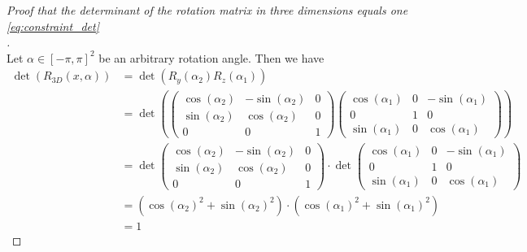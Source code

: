 \begin{proof}[Proof that the determinant of the rotation matrix in three dimensions equals one \eqref{eq:constraint_det}\\]$\,$\\
	Let $\alpha \in [-\pi, \pi]^2$ be an arbitrary rotation angle. Then we have
	\begin{equation}
	\label{proof:det_one_dim3}
	\begin{aligned}
	\det (R_{3D}(x, \alpha)) &= \det(R_{y}(\alpha_2) R_{z}(\alpha_1)) \\
	&= \det \left( \begin{pmatrix} \cos(\alpha_2) & -\sin(\alpha_2) & 0\\\sin(\alpha_2) & \cos(\alpha_2) & 0\\ 0 & 0 & 1\end{pmatrix} \begin{pmatrix} \cos(\alpha_1) & 0 & -\sin(\alpha_1)\\ 0 & 1 & 0\\\sin(\alpha_1) & 0 & \cos(\alpha_1)\end{pmatrix} \right)\\
	&= \det \begin{pmatrix} \cos(\alpha_2) & -\sin(\alpha_2) & 0\\\sin(\alpha_2) & \cos(\alpha_2) & 0\\ 0 & 0 & 1\end{pmatrix} \cdot \det \begin{pmatrix} \cos(\alpha_1) & 0 & -\sin(\alpha_1)\\ 0 & 1 & 0\\\sin(\alpha_1) & 0 & \cos(\alpha_1)\end{pmatrix}\\
	&= (\cos(\alpha_2)^2 + \sin(\alpha_2)^2) \cdot (\cos(\alpha_1)^2 + \sin(\alpha_1)^2)\\
	&= 1
	\end{aligned}
	\end{equation}
\end{proof}

